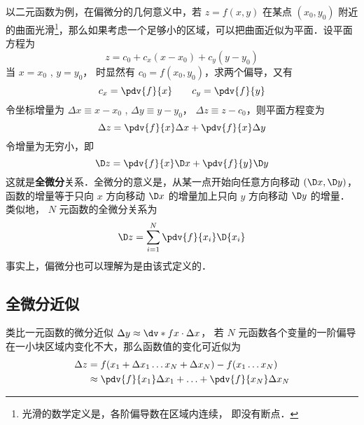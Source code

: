 

以二元函数为例，在偏微分的几何意义中，若 $z = f(x,y)$ 在某点 $({x_0},{y_0})$ 附近的曲面光滑\footnote{光滑的数学定义是，各阶偏导数在区域内连续， 即没有断点．}，那么如果考虑一个足够小的区域，可以把曲面近似为平面．设平面方程为
\begin{equation}
z = {c_0} + {c_x}(x - {x_0}) + {c_y}(y - {y_0})
\end{equation}
当 $x=x_0$ , $y=y_0$， 时显然有 ${c_0} = f({x_0},{y_0})$，求两个偏导，又有
\begin{equation}
{c_x} = \pdv{f}{x} \qquad {c_y} = \pdv{f}{y}
\end{equation}
令坐标增量为 $\Delta x \equiv x - {x_0}$ , $\Delta y \equiv y - {y_0}$，  $\Delta z \equiv z - {c_0}$，则平面方程变为
\begin{equation}
\Delta z = \pdv{f}{x}\Delta x + \pdv{f}{x}\Delta y
\end{equation}
令增量为无穷小，即
 \begin{equation}
\D z = \pdv{f}{x}\D x + \pdv{f}{y}\D y
\end{equation}
这就是\textbf{全微分}关系．全微分的意义是，从某一点开始向任意方向移动 $(\D x,\D y)$，函数的增量等于只向 $x$ 方向移动 $\D x$ 的增量加上只向 $y$ 方向移动 $\D y$ 的增量．类似地， $N$ 元函数的全微分关系为
\begin{equation}
\D z = \sum_{i = 1}^{N}\pdv{f}{x_i}\D{x_i}
\end{equation}
事实上，偏微分也可以理解为是由该式定义的．

\subsection{全微分近似}
类比一元函数的微分近似 $\Delta y \approx \dv*{f}{x}\cdot \Delta x$， 若 $N$ 元函数各个变量的一阶偏导在一小块区域内变化不大，那么函数值的变化可近似为
\begin{equation}\label{TDiff_eq6}
\begin{aligned}
\Delta z &= f(x_1+\Delta x_1\ldots x_N + \Delta x_N) - f(x_1\ldots x_N) \\
&\approx \pdv{f}{x_1}\Delta {x_1} +\ldots + \pdv{f}{x_N}\Delta {x_N}
\end{aligned}\end{equation}

